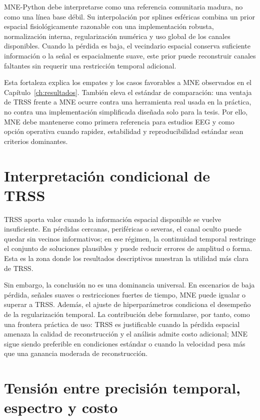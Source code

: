 MNE-Python debe interpretarse como una referencia comunitaria madura, no como una línea base débil. Su interpolación por splines esféricas combina un prior espacial fisiológicamente razonable con una implementación robusta, normalización interna, regularización numérica y uso global de los canales disponibles. Cuando la pérdida es baja, el vecindario espacial conserva suficiente información o la señal es espacialmente suave, este prior puede reconstruir canales faltantes sin requerir una restricción temporal adicional.

Esta fortaleza explica los empates y los casos favorables a MNE observados en el Capítulo~\ref{ch:resultados}. También eleva el estándar de comparación: una ventaja de TRSS frente a MNE ocurre contra una herramienta real usada en la práctica, no contra una implementación simplificada diseñada solo para la tesis. Por ello, MNE debe mantenerse como primera referencia para estudios EEG y como opción operativa cuando rapidez, estabilidad y reproducibilidad estándar sean criterios dominantes.

\section{Interpretación condicional de TRSS}

TRSS aporta valor cuando la información espacial disponible se vuelve insuficiente. En pérdidas cercanas, periféricas o severas, el canal oculto puede quedar sin vecinos informativos; en ese régimen, la continuidad temporal restringe el conjunto de soluciones plausibles y puede reducir errores de amplitud o forma. Esta es la zona donde los resultados descriptivos muestran la utilidad más clara de TRSS.

Sin embargo, la conclusión no es una dominancia universal. En escenarios de baja pérdida, señales suaves o restricciones fuertes de tiempo, MNE puede igualar o superar a TRSS. Además, el ajuste de hiperparámetros condiciona el desempeño de la regularización temporal. La contribución debe formularse, por tanto, como una frontera práctica de uso: TRSS es justificable cuando la pérdida espacial amenaza la calidad de reconstrucción y el análisis admite costo adicional; MNE sigue siendo preferible en condiciones estándar o cuando la velocidad pesa más que una ganancia moderada de reconstrucción.

\section{Tensión entre precisión temporal, espectro y costo}

